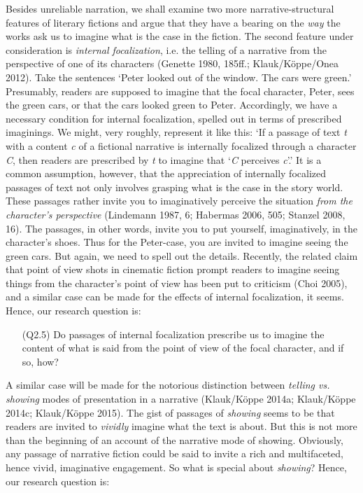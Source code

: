 \noindent Besides unreliable narration, we shall examine two more narrative-structural features of literary fictions and argue that they have a bearing on the \emph{way} the works ask us to imagine what is the case in the fiction. The second feature under consideration is \emph{internal focalization}, i.e. the telling of a narrative from the perspective of one of its characters (Genette 1980, 185ff.; Klauk/K\"oppe/Onea 2012). Take the sentences `Peter looked out of the window. The cars were green.' Presumably, readers are supposed to imagine that the focal character, Peter, sees the green cars, or that the cars looked green to Peter. Accordingly, we have a necessary condition for internal focalization, spelled out in terms of prescribed imaginings. We might, very roughly, represent it like this: `If a passage of text \emph{t} with a content \emph{c} of a fictional narrative is internally focalized through a character \emph{C}, then readers are prescribed by \emph{t} to imagine that `\emph{C} perceives \emph{c}'.' It is a common assumption, however, that the appreciation of internally focalized passages of text not only involves grasping what is the case in the story world. These passages rather invite you to imaginatively perceive the situation \emph{from the character's perspective} (Lindemann 1987, 6; Habermas 2006, 505; Stanzel 2008, 16). The passages, in other words, invite you to put yourself, imaginatively, in the character's shoes. Thus for the Peter-case, you are invited to
imagine seeing the green cars. But again, we need to spell out the details. Recently, the related claim that point of view shots in cinematic fiction prompt readers to imagine seeing things from the character's point of view has been put to criticism (Choi 2005), and a similar case can be made for the effects of internal focalization, it seems. Hence, our research question is:

\vspace{-.1cm}
\begin{itemize}[leftmargin=2cm]
\item[(Q2.5)] Do passages of internal focalization prescribe us to imagine the content of what is said from  the point of view of the focal character, and if so, how? 
\end{itemize}
\vspace{-.1cm}

\noindent A similar case will be made for the notorious distinction between \emph{telling vs. showing} modes of presentation in a narrative (Klauk/K\"oppe 2014a; Klauk/K\"oppe 2014c; Klauk/K\"oppe 2015). The gist of passages of \emph{showing} seems to be that readers are invited to \emph{vividly} imagine what the text is about. But this is not more than the beginning of an account of the narrative mode of showing. Obviously, any passage of narrative fiction could be said to invite a rich and multifaceted, hence vivid, imaginative engagement. So what is special about \emph{showing}? Hence, our research question is:

